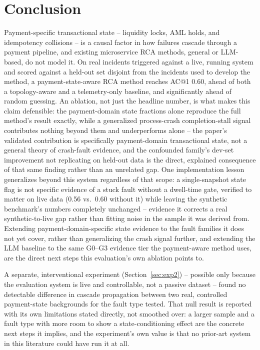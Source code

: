 \documentclass[conference]{IEEEtran}
\begin{document}
\section{Conclusion}
\label{sec:conclusion}

Payment-specific transactional state -- liquidity locks, AML holds, and
idempotency collisions -- is a causal factor in how failures cascade
through a payment pipeline, and existing microservice RCA methods, general
or LLM-based, do not model it. On real incidents triggered against a live,
running system and scored against a held-out set disjoint from the
incidents used to develop the method, a payment-state-aware RCA method
reaches AC@1 0.60, ahead of both a topology-aware and a telemetry-only
baseline, and significantly ahead of random guessing. An ablation, not
just the headline number, is what makes this claim defensible: the
payment-domain state fractions alone reproduce the full method's result
exactly, while a generalized process-crash completion-stall signal
contributes nothing beyond them and underperforms alone -- the paper's
validated contribution is specifically payment-domain transactional
state, not a general theory of crash-fault evidence, and the confounded
family's dev-set improvement not replicating on held-out data is the
direct, explained consequence of that same finding rather than an
unrelated gap. One implementation lesson generalizes beyond this system
regardless of that scope: a single-snapshot state flag is not specific
evidence of a stuck fault without a dwell-time gate, verified to matter on
live data (0.56 vs.\ 0.60 without it) while leaving the synthetic
benchmark's numbers completely unchanged -- evidence it corrects a real
synthetic-to-live gap rather than fitting noise in the sample it was
derived from. Extending payment-domain-specific state evidence to the
fault families it does not yet cover, rather than generalizing the crash
signal further, and extending the LLM baseline to the same G0--G3 evidence
tier the payment-aware method uses, are the direct next steps this
evaluation's own ablation points to.

A separate, interventional experiment (Section~\ref{sec:exp2}) --
possible only because the evaluation system is live and controllable, not
a passive dataset -- found no detectable difference in cascade
propagation between two real, controlled payment-state backgrounds for
the fault type tested. That null result is reported with its own
limitations stated directly, not smoothed over: a larger sample and a
fault type with more room to show a state-conditioning effect are the
concrete next steps it implies, and the experiment's own value is that no
prior-art system in this literature could have run it at all.



\end{document}
